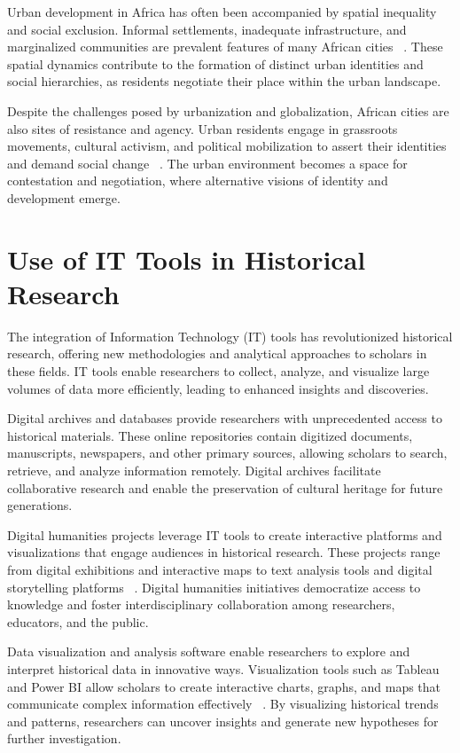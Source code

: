 Urban development in Africa has often been accompanied by spatial inequality and social exclusion. Informal settlements, inadequate infrastructure, and marginalized communities are prevalent features of many African cities ~\cite{falola2008history}. These spatial dynamics contribute to the formation of distinct urban identities and social hierarchies, as residents negotiate their place within the urban landscape.

Despite the challenges posed by urbanization and globalization, African cities are also sites of resistance and agency. Urban residents engage in grassroots movements, cultural activism, and political mobilization to assert their identities and demand social change ~\cite{Onilude}. The urban environment becomes a space for contestation and negotiation, where alternative visions of identity and development emerge.

\section{Use of IT Tools in Historical Research}
The integration of Information Technology (IT) tools has revolutionized historical research, offering new methodologies and analytical approaches to scholars in these fields. IT tools enable researchers to collect, analyze, and visualize large volumes of data more efficiently, leading to enhanced insights and discoveries.

Digital archives and databases provide researchers with unprecedented access to historical materials. These online repositories contain digitized documents, manuscripts, newspapers, and other primary sources, allowing scholars to search, retrieve, and analyze information remotely. Digital archives facilitate collaborative research and enable the preservation of cultural heritage for future generations.

Digital humanities projects leverage IT tools to create interactive platforms and visualizations that engage audiences in historical research. These projects range from digital exhibitions and interactive maps to text analysis tools and digital storytelling platforms ~\cite{Bolstad}. Digital humanities initiatives democratize access to knowledge and foster interdisciplinary collaboration among researchers, educators, and the public.

Data visualization and analysis software enable researchers to explore and interpret historical data in innovative ways. Visualization tools such as Tableau and Power BI allow scholars to create interactive charts, graphs, and maps that communicate complex information effectively ~\cite{Few}. By visualizing historical trends and patterns, researchers can uncover insights and generate new hypotheses for further investigation.
